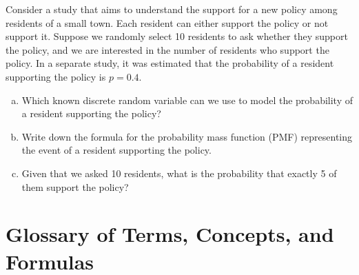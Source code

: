 \documentclass{article}
\begin{document}
Consider a study that aims to understand the support for a new policy among residents of a small town. Each resident can either support the policy or not support it. Suppose we randomly select 10 residents to ask whether they support the policy, and we are interested in the number of residents who support the policy. In a separate study, it was estimated that the probability of a resident supporting the policy is \(p = 0.4\).

\begin{enumerate}[a)]
\item Which known discrete random variable can we use to model the probability of a resident supporting the policy?
\item Write down the formula for the probability mass function (PMF) representing the event of a resident supporting the policy.
\item Given that we asked 10 residents, what is the probability that exactly 5 of them support the policy?
\end{enumerate}


\newpage
\section*{Glossary of Terms, Concepts, and Formulas}
\end{document}
